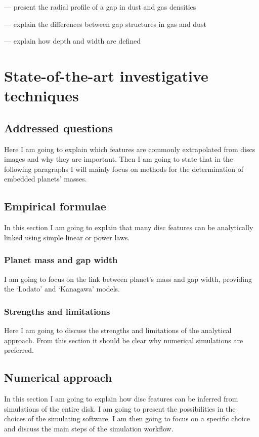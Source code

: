 \documentclass[a4paper,10pt]{report}
\begin{document}
— present the radial profile of a gap in dust and gas densities

— explain the differences between gap structures in gas and dust 

— explain how depth and width are defined


\chapter{State-of-the-art investigative techniques}


\section{Addressed questions}

Here I am going to explain which features are commonly extrapolated 
from discs images and why they are important.
Then I am going to state that in the following paragraphs I will mainly focus 
on methods for the determination of embedded planets' masses.

\section{Empirical formulae}

In this section I am going to explain that many disc features can be analytically 
linked using simple linear or power laws.

\subsection{Planet mass and gap width}
I am going to focus on the link between planet's mass and gap width,
providing the `Lodato' and `Kanagawa' models.

\subsection{Strengths and limitations}
Here I am going to discuss the strengths and limitations of the analytical approach.
From this section it should be clear why numerical simulations are preferred.

\section{Numerical approach}
In this section I am going to explain how disc features can be inferred 
from simulations of the entire disk. I am going to present the possibilities
in the choices of the simulating software.
I am then going to focus on a specific choice and discuss the main steps of the 
simulation workflow.
\end{document}
